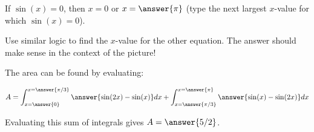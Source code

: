 \documentclass{ximera}
\begin{document}
\begin{exercise}
\begin{exercise}
\begin{hint}
If $\sin(x) =0$, then $x=0$ or $x = \answer{\pi}$ (type the next largest $x$-value for which $\sin(x) =0$).

Use similar logic to find the $x$-value for the other equation.  The answer should make sense in the context of the picture!

\end{hint}

\end{exercise}

\begin{exercise}
The area can be found by evaluating:

\[
A= \int_{x= \answer{0}}^{x= \answer{\pi/3}} \answer{\sin(2x) - \sin(x)} dx + \int_{x= \answer{\pi/3}}^{x= \answer{\pi}} \answer{\sin(x) - \sin(2x)} dx
\]
\end{exercise}

\begin{exercise}
Evaluating this sum of integrals gives $A = \answer{5/2}$.	
\end{exercise}

\end{exercise}
\end{document}
